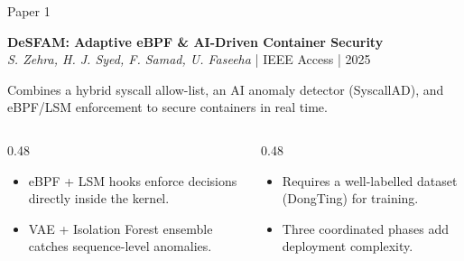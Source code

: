 \documentclass[aspectratio=169,11pt]{beamer}
\begin{document}
\begin{frame}{Paper 1}
\vspace{0.4cm}
\begin{center}
{\Large\bfseries DeSFAM: Adaptive eBPF \& AI-Driven Container Security}\\[0.15cm]
{\small\color{DarkGray}\textit{S. Zehra, H. J. Syed, F. Samad, U. Faseeha} | IEEE Access | 2025}
\end{center}

\vspace{0.2cm}
{\small Combines a hybrid syscall allow-list, an AI anomaly detector (SyscallAD), and eBPF/LSM enforcement to secure containers in real time.}

\vspace{0.2cm}
\begin{columns}[T,onlytextwidth]
\begin{column}{0.48\textwidth}
\begin{tcolorbox}[colback=green!5,colframe=green!50!black,title={\textcolor{green!50!black}{\faCheckCircle}~Where It Wins},fonttitle=\bfseries\small,boxrule=0.5pt,arc=2mm,left=2mm,right=2mm,top=1mm,bottom=1mm]
\footnotesize
\begin{itemize}
  \item eBPF + LSM hooks enforce decisions directly inside the kernel.
  \item VAE + Isolation Forest ensemble catches sequence-level anomalies.
\end{itemize}
\end{tcolorbox}
\end{column}

\begin{column}{0.48\textwidth}
\begin{tcolorbox}[colback=red!5,colframe=red!50!black,title={\textcolor{red}{\faTimesCircle}~Where It Struggles},fonttitle=\bfseries\small,boxrule=0.5pt,arc=2mm,left=2mm,right=2mm,top=1mm,bottom=1mm]
\footnotesize
\begin{itemize}
  \item Requires a well-labelled dataset (DongTing) for training.
  \item Three coordinated phases add deployment complexity.
\end{itemize}
\end{tcolorbox}
\end{column}
\end{columns}
\end{frame}
\end{document}
